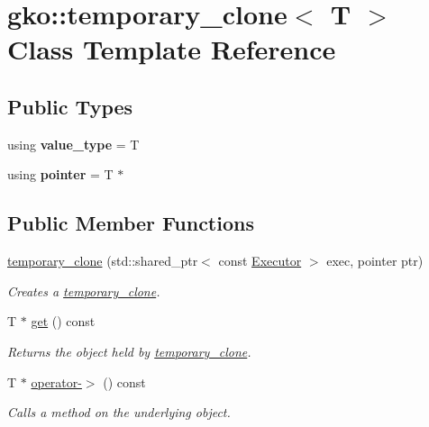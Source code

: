 \hypertarget{classgko_1_1temporary__clone}{}\section{gko\+:\+:temporary\+\_\+clone$<$ T $>$ Class Template Reference}
\label{classgko_1_1temporary__clone}
\subsection*{Public Types}
\begin{DoxyCompactItemize}
\item 
\mbox{\label{classgko_1_1temporary__clone_a2f2b1cb12c1b32666695d9ac90b8a795}} 
using {\bfseries value\+\_\+type} = T
\item 
\mbox{\label{classgko_1_1temporary__clone_a76f3d8f1dd6170d4063a56144794e881}} 
using {\bfseries pointer} = T $\ast$
\end{DoxyCompactItemize}
\subsection*{Public Member Functions}
\begin{DoxyCompactItemize}
\item 
\hyperlink{classgko_1_1temporary__clone_a73b2e7db31555df95b827625f85da4be}{temporary\+\_\+clone} (std\+::shared\+\_\+ptr$<$ const \hyperlink{classgko_1_1Executor}{Executor} $>$ exec, pointer ptr)
\begin{DoxyCompactList}\small\item\em Creates a \hyperlink{classgko_1_1temporary__clone}{temporary\+\_\+clone}. \end{DoxyCompactList}\item 
T $\ast$ \hyperlink{classgko_1_1temporary__clone_a38042e39a039070cc97e225435d5ed9e}{get} () const
\begin{DoxyCompactList}\small\item\em Returns the object held by \hyperlink{classgko_1_1temporary__clone}{temporary\+\_\+clone}. \end{DoxyCompactList}\item 
T $\ast$ \hyperlink{classgko_1_1temporary__clone_a007bc247a9a250dcec8cdadb54710106}{operator-\/$>$} () const
\begin{DoxyCompactList}\small\item\em Calls a method on the underlying object. \end{DoxyCompactList}\end{DoxyCompactItemize}


